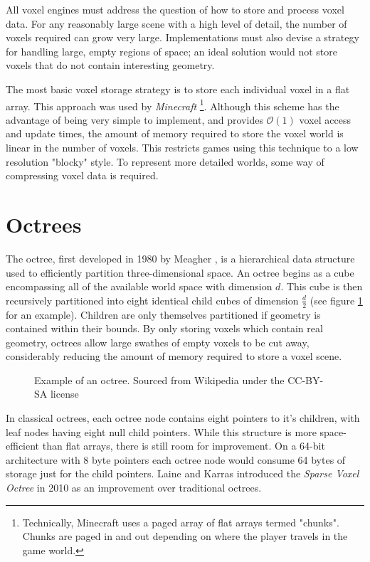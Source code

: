 All voxel engines must address the question of how to store and process voxel data. For any reasonably large scene with a high level of detail, the number of voxels required can grow very large. Implementations must also devise a strategy for handling large, empty regions of space; an ideal solution would not store voxels that do not contain interesting geometry.

The most basic voxel storage strategy is to store each individual voxel in a flat array. This approach was used by \textit{Minecraft} \autocite{minecraftchunkformat} \footnote{Technically, Minecraft uses a paged array of flat arrays termed "chunks". Chunks are paged in and out depending on where the player travels in the game world.}. Although this scheme has the advantage of being very simple to implement, and provides $\mathcal{O}(1)$ voxel access and update times, the amount of memory required to store the voxel world is linear in the number of voxels. This restricts games using this technique to a low resolution "blocky" style. To represent more detailed worlds, some way of compressing voxel data is required.

\section{Octrees}
The octree, first developed in 1980 by Meagher \autocite{meagher1980octree}, is a hierarchical data structure used to efficiently partition three-dimensional space. An octree begins as a cube encompassing all of the available world space with dimension $d$. This cube is then recursively partitioned into eight identical child cubes of dimension $\frac{d}{2}$ (see figure \ref{fig:octree_example} for an example). Children are only themselves partitioned if geometry is contained within their bounds. By only storing voxels which contain real geometry, octrees allow large swathes of empty voxels to be cut away, considerably reducing the amount of memory required to store a voxel scene.

\begin{figure}[ht]
    \centering
    
    \caption{Example of an octree. Sourced from Wikipedia under the CC-BY-SA license}
    \label{fig:octree_example}
\end{figure}

In classical octrees, each octree node contains eight pointers to it's children, with leaf nodes having eight null child pointers. While this structure is more space-efficient than flat arrays, there is still room for improvement. On a 64-bit architecture with 8 byte pointers each octree node would consume 64 bytes of storage just for the child pointers. Laine and Karras introduced the \textit{Sparse Voxel Octree} in 2010 \autocite{laine2010efficient} as an improvement over traditional octrees.

